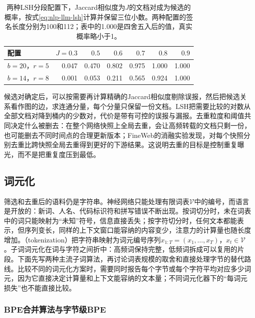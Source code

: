 \begin{table}[htbp]
  \centering
  \begin{tabular}{@{}lrrrrrr@{}}
    \toprule
    配置 & $J=0.3$ & $0.5$ & $0.6$ & $0.7$ & $0.8$ & $0.9$\\
    \midrule
    $b=20$，$r=5$ & 0.047 & 0.470 & 0.802 & 0.975 & 1.000 & 1.000\\
    $b=14$，$r=8$ & 0.001 & 0.053 & 0.211 & 0.565 & 0.924 & 1.000\\
    \bottomrule
  \end{tabular}
  \caption{两种LSH分段配置下，Jaccard相似度为$J$的文档对成为候选的概率，按式\eqref{eq:nlp-llm-lsh}计算并保留三位小数。两种配置的签名长度分别为100和112；表中的1.000是四舍五入后的值，真实概率略小于1。}
  \label{tab:nlp-llm-lsh-probability}
\end{table}

候选对确定后，可以按需要再计算精确的Jaccard相似度剔除误报，然后把候选关系看作图的边，求连通分量，每个分量只保留一份文档。LSH把需要比较的对数从全部文档对降到桶内的少数对，代价是带有可控的误报与漏报。去重粒度和阈值共同决定什么被删去：在整个网络快照上全局去重，会让高频转载的文档只剩一份，也可能删去不同时间点的合理更新版本；FineWeb的消融实验发现，对每个快照分别去重比跨快照全局去重得到更好的下游结果。这说明去重的目标是控制重复曝光，而不是把重复度压到最低。

\subsection{词元化}
\label{sec:nlp-llm-tokenization}

筛选和去重后的语料仍是字符串。神经网络只能处理有限词表$\mathcal V$中的编号，而语言是开放的：新词、人名、代码标识符和拼写错误不断出现。按词切分时，未在词表中的词只能映射为“未知”符号，信息直接丢失；按字符切分时，任何文本都能表示，但序列变长，同样的上下文窗口能容纳的内容变少，注意力的计算量也随长度增加。（tokenization）把字符串映射为词元编号序列$x_{1:T}=(x_1,\ldots,x_T)$，$x_t\in\mathcal V$。子词词元化在词与字符之间折中：高频词保持完整，低频词拆成可以复用的片段。下面先写两种主流子词算法，再讨论词表规模的取舍和直接处理字节的替代路线。比较不同的词元化方案时，需要同时报告每个字节或每个字符平均对应多少词元，因为它直接决定计算量和上下文能容纳的文本量；不同词元化器下的“每词元损失”也不能直接比较。

\subsubsection{BPE合并算法与字节级BPE}
\label{sec:nlp-llm-bpe}

